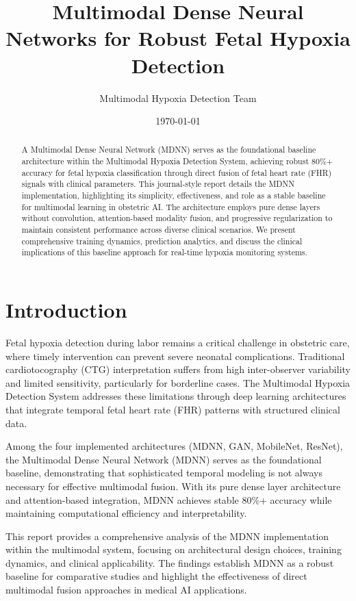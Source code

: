 \documentclass[12pt,a4paper]{article}
\title{Multimodal Dense Neural Networks for Robust Fetal Hypoxia Detection}
\author{Multimodal Hypoxia Detection Team}
\date{\today}
\begin{document}
\maketitle

\begin{abstract}
A Multimodal Dense Neural Network (MDNN) serves as the foundational baseline architecture within the Multimodal Hypoxia Detection System, achieving robust 80\%+ accuracy for fetal hypoxia classification through direct fusion of fetal heart rate (FHR) signals with clinical parameters. This journal-style report details the MDNN implementation, highlighting its simplicity, effectiveness, and role as a stable baseline for multimodal learning in obstetric AI. The architecture employs pure dense layers without convolution, attention-based modality fusion, and progressive regularization to maintain consistent performance across diverse clinical scenarios. We present comprehensive training dynamics, prediction analytics, and discuss the clinical implications of this baseline approach for real-time hypoxia monitoring systems.
\end{abstract}

\tableofcontents
\newpage

\section{Introduction}

Fetal hypoxia detection during labor remains a critical challenge in obstetric care, where timely intervention can prevent severe neonatal complications. Traditional cardiotocography (CTG) interpretation suffers from high inter-observer variability and limited sensitivity, particularly for borderline cases. The Multimodal Hypoxia Detection System addresses these limitations through deep learning architectures that integrate temporal fetal heart rate (FHR) patterns with structured clinical data.

Among the four implemented architectures (MDNN, GAN, MobileNet, ResNet), the Multimodal Dense Neural Network (MDNN) serves as the foundational baseline, demonstrating that sophisticated temporal modeling is not always necessary for effective multimodal fusion. With its pure dense layer architecture and attention-based integration, MDNN achieves stable 80\%+ accuracy while maintaining computational efficiency and interpretability.

This report provides a comprehensive analysis of the MDNN implementation within the multimodal system, focusing on architectural design choices, training dynamics, and clinical applicability. The findings establish MDNN as a robust baseline for comparative studies and highlight the effectiveness of direct multimodal fusion approaches in medical AI applications.
\end{document}
